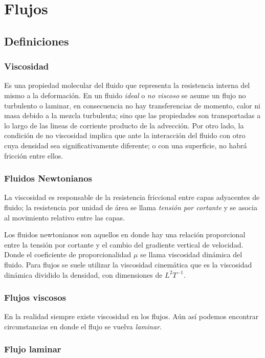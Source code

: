\documentclass[openany]{book}
\begin{document}
\chapter{Flujos}
\section{Definiciones}

\subsection{Viscosidad}

Es una propiedad molecular del fluido que representa la resistencia interna del mismo a la deformación. 
En un fluido \emph{ideal} o \emph{no viscoso} se asume un flujo 
no turbulento o laminar, en consecuencia no hay transferencias 
de momento, calor ni masa debido a la mezcla turbulenta; sino 
que las propiedades son transportadas a lo largo de las lineas 
de corriente producto de la advección. Por otro lado, la 
condición de no viscosidad implica que ante la interacción del 
fluido con otro cuya densidad sea significativamente diferente; 
o con una superficie, no habrá fricción entre ellos.

\subsection{Fluidos Newtonianos}
La viscosidad es responsable de la resistencia friccional entre capas adyacentes de fluido; la resistencia por unidad de área se llama \emph{tensión por cortante} y se asocia al movimiento relativo entre las capas.

Los fluidos newtonianos son aquellos en donde hay una relación 
proporcional entre la tensión por cortante y el cambio del 
gradiente vertical de velocidad. Donde el coeficiente de 
proporcionalidad $\mu$ se llama viscosidad dinámica del fluido. 
Para flujos se suele utilizar la viscosidad cinemática que es la 
viscosidad dinámica dividido la densidad, con dimensiones de 
$L^2 T^{-1}$.

\subsection{Flujos viscosos}

En la realidad siempre existe viscosidad en los flujos. Aún 
así podemos encontrar circunstancias en donde el flujo se 
vuelva \emph{laminar}.

\subsection{Flujo laminar}
\end{document}
